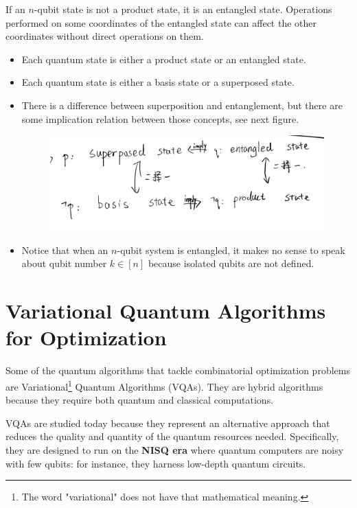 If an $n$-qubit state is not a product state, it is an entangled state. Operations performed on some coordinates of the entangled state can affect the other coordinates without direct operations on them.

\begin{remark}
    \begin{itemize}
    \item Each quantum state is either a product state or an entangled state.
    \item Each quantum state is either a basis state or a superposed state.
    \item There is a difference between superposition and entanglement, but there are some implication relation between those concepts, see next figure. %
\begin{figure}[ht]
    \centering
    \includegraphics[width=0.75\linewidth]{Images/relation-superposed-entangled.jpg}
\end{figure}
    \item Notice that when an $n$-qubit system is entangled, it makes no sense to speak about qubit number $k \in[n]$ because isolated qubits are not defined. 
    \end{itemize}
\end{remark}

\section{Variational Quantum Algorithms for Optimization}

Some of the quantum algorithms that tackle combinatorial optimization problems are Variational\footnote{The word "variational" does not have that mathematical meaning.} Quantum Algorithms (VQAs). They are hybrid algorithms because they require both quantum and classical computations. 

VQAs are studied today because they represent an alternative approach that reduces the quality and quantity of the quantum resources needed. Specifically, they are designed to run on the \textbf{NISQ era} where quantum computers are noisy with few qubits: for instance, they harness low-depth quantum circuits.

